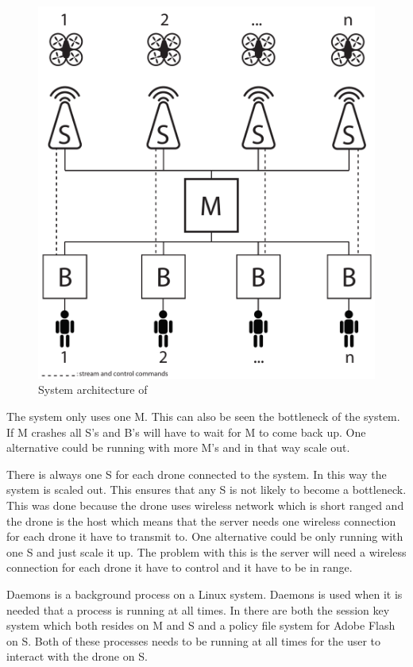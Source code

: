 \begin{figure}[htb]
    \centering 
    \includegraphics[width=\textwidth]{gfx/system_architecture.pdf}
    \caption{System architecture of \projectname{}}
    \label{fig:system_architecture}
\end{figure}

The system only uses one M. This can also be seen the bottleneck of the system. If M crashes all S's and B's will have to wait for M to come back up.
One alternative could be running with more M's and in that way scale out.

There is always one S for each drone connected to the system. In this way the system is scaled out. This ensures that any S is not likely to become a bottleneck.
This was done because the drone uses wireless network which is short ranged and the drone is the host which means that the server needs one wireless connection for each drone it have to transmit to.
One alternative could be only running with one S and just scale it up. The problem with this is the server will need a wireless connection for each drone it have to control and it have to be in range.

Daemons is a background process on a Linux system.
Daemons is used when it is needed that a process is running at all times. In \projectname{} there are both the session key system which both resides on M and S and a policy file system for Adobe Flash on S. Both of these processes needs to be running at all times for the user to interact with the drone on S.

